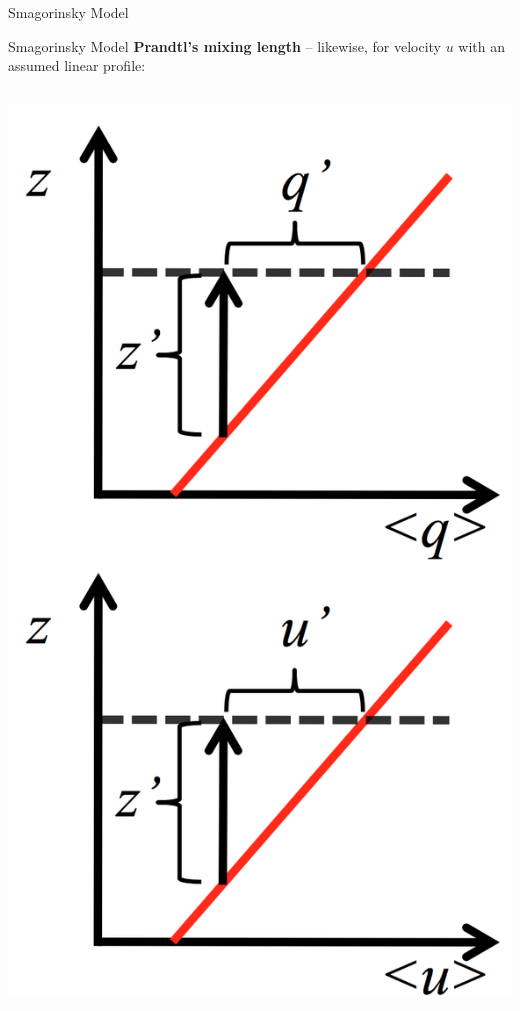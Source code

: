\begin{frame}{Smagorinsky Model}
\end{frame}

\begin{frame}{Smagorinsky Model}
\textbf{Prandtl's mixing length} -- likewise, for velocity $u$ with an assumed linear profile:

\begin{columns}[T]
	\begin{column}{.26\textwidth}
    	\begin{minipage}[c][.5\textheight][c]{\linewidth}
    		\includegraphics[width=1\textwidth]{mixing_length}

\end{minipage}
\end{column}
\end{columns}
\end{frame}
